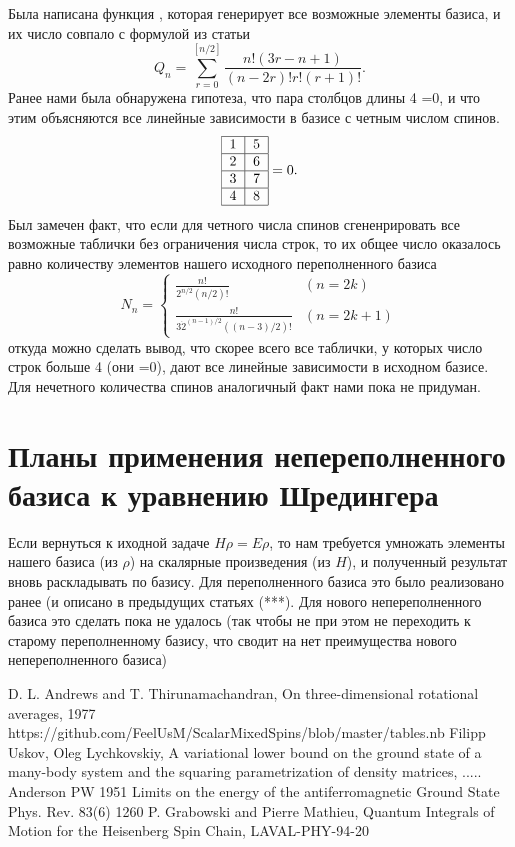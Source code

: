 \documentclass[]{article}
\begin{document}
Была написана функция \cite{basis_gen_code}, которая генерирует все возможные элементы базиса, и их число совпало с формулой из статьи
$$Q_n = \sum_{r=0}^{[n/2]}\frac{n!(3r-n+1)}{(n-2r)!r!(r+1)!}.$$
Ранее нами была обнаружена гипотеза, что пара столбцов длины 4 =0, и что этим объясняются все линейные зависимости в базисе с четным числом спинов.
$$ \begin{tabular}{ |l|l| }
\hline
1 & 5 \\ \hline
2 & 6\\ \hline
3 & 7\\ \hline
4 & 8\\
\hline
\end{tabular}=0 .
$$
Был замечен факт, что если для четного числа спинов сгененрировать все возможные таблички без ограничения числа строк,
то их общее число оказалось равно количеству элементов нашего исходного переполненного базиса
$$N_n=\begin{cases}
\frac{n!}{2^{n/2}(n/2)!} & (n=2k)\\
\frac{n!}{3\dot 2^{(n-1)/2}((n-3)/2)!} & (n=2k+1)
\end{cases}$$
откуда можно сделать вывод, что скорее всего все таблички, у которых число строк больше 4 (они =0), дают все линейные зависимости в исходном базисе.
Для нечетного количества спинов аналогичный факт нами пока не придуман.

\section{Планы применения непереполненного базиса к уравнению Шредингера}
Если вернуться к иходной задаче $H \rho = E \rho$, то 
нам требуется умножать элементы нашего базиса (из $\rho$) на скалярные произведения (из $H$), и полученный результат вновь раскладывать по базису.
Для переполненного базиса это было реализовано ранее (и описано в предыдущих статьях (***).
Для нового непереполненного базиса это сделать пока не удалось (так чтобы не при этом не переходить к старому переполненному базису, что сводит на нет преимущества нового непереполненного базиса)

\begin{thebibliography}{3}
	D. L. Andrews and T. Thirunamachandran, On three-dimensional rotational averages, 1977
	https://github.com/FeelUsM/ScalarMixedSpins/blob/master/tables.nb
	Filipp Uskov, Oleg Lychkovskiy, A variational lower bound on the ground state of a many-body system and the squaring parametrization of density matrices, .....
	Anderson PW 1951 Limits on the energy of the antiferromagnetic Ground State Phys. Rev. 83(6) 1260
	P. Grabowski and Pierre Mathieu, Quantum Integrals of Motion for the Heisenberg Spin Chain, LAVAL-PHY-94-20
\end{thebibliography}
\end{document}
